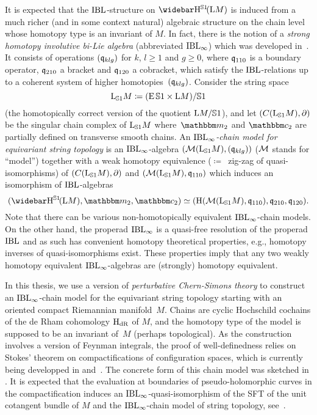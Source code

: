 \documentclass[\MainFolder/Text.tex]{subfiles}
\begin{document}
It is expected that the $\mathrm{IBL}$-structure on $\RedEquivHom(\Loop M)$ is induced from a much richer (and in some context natural) algebraic structure on the chain level whose homotopy type is an invariant of $M$. In fact, there is the notion of a \emph{strong homotopy involutive bi-Lie algebra} (abbreviated $\mathrm{IBL}_\infty$) which was developed in~\cite{Cieliebak2015}. It consists of operations $(\mathfrak{q}_{klg})$ for $k$, $l \ge 1$ and $g\ge 0$, where $\mathfrak{q}_{110}$ is a boundary operator, $\mathfrak{q}_{210}$ a bracket and $\mathfrak{q}_{120}$ a cobracket, which satisfy the $\mathrm{IBL}$-relations up to a coherent system of higher homotopies~$(\mathfrak{q}_{klg})$. Consider the string space 
\[ \mathrm{L}_{\mathbb{S}{1}} M \coloneqq (\operatorname{E}\mathbb{S}{1}\times \mathrm{L} M)/\mathbb{S}{1} \]
(the homotopically correct version of the quotient $\mathrm{L} M/\mathbb{S}{1}$), and let $(C(\mathrm{L}_{\mathbb{S}{1}} M),\partial)$ be the singular chain complex of $\mathrm{L}_{\mathbb{S}{1}} M$ where~$\StringOp_2$ and $\StringCoOp_2$ are partially defined on transverse smooth chains. An \emph{$\mathrm{IBL}_\infty$-chain model for equivariant string topology} is an $\mathrm{IBL}_\infty$-algebra $(\mathcal{M}(\mathrm{L}_{\mathbb{S}{1}} M),(\mathfrak{q}_{klg}))$ ($\mathcal{M}$ stands for ``model'') together with a weak homotopy equivalence  ($\coloneqq$~zig-zag of quasi-isomorphisms) of $(C(\mathrm{L}_{\mathbb{S}{1}} M),\partial)$ and $(\mathcal{M}(\mathrm{L}_{\mathbb{S}{1}} M),\mathfrak{q}_{110})$ which induces an isomorphism of $\mathrm{IBL}$-algebras
\[ (\RedEquivHom(\Loop M),\StringOp_2,\StringCoOp_2) \simeq (\H(\Model(\StringSpace M),\OPQ_{110}), \OPQ_{210}, \OPQ_{120}). \]
Note that there can be various non-homotopically equivalent $\mathrm{IBL}_\infty$-chain models. On the other hand, the properad $\mathrm{IBL}_\infty$ is a quasi-free resolution of the properad $\mathrm{IBL}$ and as such has convenient homotopy theoretical properties, e.g., homotopy inverses of quasi-isomorphisms exist. These properties imply that any two weakly homotopy equivalent $\mathrm{IBL}_\infty$-algebras are (strongly) homotopy equivalent.


In this thesis, we use a version of \emph{perturbative Chern-Simons theory} to construct an $\mathrm{IBL}_\infty$-chain model for the equivariant string topology starting with an oriented compact Riemannian manifold~$M$. Chains are cyclic Hochschild cochains of the de Rham cohomology $\mathrm{H}_{\mathrm{dR}}$ of $M$, and the homotopy type of the model is supposed to be an invariant of~$M$ (perhaps topological). As the construction involves a version of Feynman integrals, the proof of well-definedness relies on Stokes' theorem on compactifications of configuration spaces, which is currently being developped in \cite{Cieliebak2018} and~\cite{Cieliebak2018b}. The concrete form of this chain model was sketched in \cite{Cieliebak2015}. It is expected that the evaluation at boundaries of pseudo-holomorphic curves in the compactification induces an $\mathrm{IBL}_\infty$-quasi-isomorphism of the SFT of the unit cotangent bundle of $M$ and the $\mathrm{IBL}_\infty$-chain model of string topology, see~\cite{Cieliebak2007}.
\end{document}
